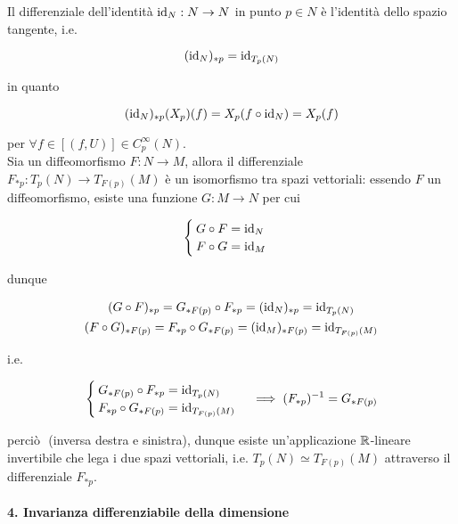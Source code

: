Il differenziale dell'identità $ \operatorname{id}_{N} : N \to N $ in punto $ p \in N $ è l'identità dello spazio tangente, i.e.
	
\begin{equation}
	(\operatorname{id}_{N})_{*p} = \operatorname{id}_{T_{p}(N)}
\end{equation}

in quanto

\begin{equation}
		(\id_{N})_{*p} (X_{p})(f) = X_{p} (f \circ \id_{N}) %
		= X_{p}(f)
\end{equation}

per $ \forall f \in [(f,U)] \in C^{\infty}_{p}(N) $.\\
Sia un diffeomorfismo $ F : N \to M $, allora il differenziale $ F_{*p} : T_{p}(N) \to T_{F(p)}(M) $ è un isomorfismo tra spazi vettoriali: essendo $ F $ un diffeomorfismo, esiste una funzione $ G : M \to N $ per cui

\begin{equation}
	\begin{cases}
		G \circ F = \operatorname{id}_{N}\\
		F \circ G = \operatorname{id}_{M}
	\end{cases}
\end{equation}

dunque

\begin{gather}
	(G \circ F)_{*p} = G_{*F(p)} \circ F_{*p} %
	= (\id_{N})_{*p} %
	= \id_{T_{p}(N)}\\
	(F \circ G)_{*F(p)} = F_{*p} \circ G_{*F(p)} %
	= (\id_{M})_{*F(p)} %
	= \id_{T_{F(p)}(M)}
\end{gather}

i.e.

\begin{equation}
	\begin{cases}
		G_{*F(p)} \circ F_{*p} = \id_{T_{p}(N)}\\
		F_{*p} \circ G_{*F(p)} = \id_{T_{F(p)}(M)}
	\end{cases}%
	\implies %
	(F_{*p})^{-1} = G_{*F(p)}
\end{equation}

perciò $  $ (inversa destra e sinistra), dunque esiste un'applicazione $ \mathbb{R} $-lineare invertibile che lega i due spazi vettoriali, i.e. $ T_{p}(N) \simeq T_{F(p)}(M) $ attraverso il differenziale $ F_{*p} $.

\paragraph{4. Invarianza differenziabile della dimensione}

